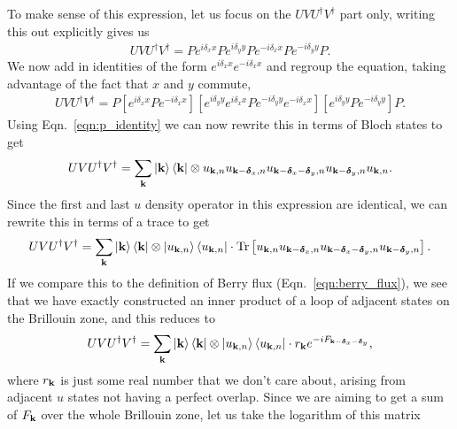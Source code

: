 To make sense of this expression, let us focus on the $  U V U^\dag  V^\dag$ part only, writing this out explicitly gives us
\begin{align}
	  U V U^\dag  V^\dag =  P e^{i \delta_x  x}  P e^{i \delta_y  y}  P e^{- i \delta_x  x}  P e^{-i \delta_y  y}  P.
\end{align}
We now add in identities of the form $e^{i \delta_x  x} e^{-i \delta_x  x} $ and regroup the equation, taking advantage of the fact that $x$ and $y$ commute,
\begin{align}
	U V U^\dag  V^\dag =   P
	\left [ 
		e^{i \delta_x  x}  P e^{-i \delta_x  x} 
	\right ]
	\left [ 
		e^{i \delta_y  y} e^{i \delta_x  x}  P  e^{-i \delta_y  y} e^{- i \delta_x  x } 
	\right ]
	\left [ 
		e^{i \delta_y  y}  P e^{-i \delta_y  y } 
	\right ]
	P.
\end{align}
Using Eqn.~\ref{eqn:p_identity} we can now rewrite this in terms of Bloch states to get
\begin{align}
	 U V U^\dag  V^\dag = \sum_{\textbf k} \ket{\textbf k } \bra{\textbf k } \otimes   u_{\textbf k, n}   u_{\textbf k -\boldsymbol{\delta}_x , n}   u_{\textbf k-\boldsymbol{\delta}_x-\boldsymbol{\delta}_y, n}   u_{\textbf k-\boldsymbol{\delta}_y, n}   u_{\textbf k, n}.
\end{align}
Since the first and last $ u$ density operator in this expression are identical, we can rewrite this in terms of a trace to get
\begin{align}
	 U V U^\dag  V^\dag = \sum_{\textbf k} \ket{\textbf k } \bra{\textbf k } \otimes  \ket {u_{\textbf k, n}} \bra{u_{\textbf k, n}} \cdot  \textup{Tr} \left [  u_{\textbf k, n}  u_{\textbf k -\boldsymbol{\delta}_x , n}   u_{\textbf k-\boldsymbol{\delta}_x-\boldsymbol{\delta}_y, n}   u_{\textbf k-\boldsymbol{\delta}_y, n} \right ].
\end{align}
If we compare this to the definition of Berry flux (Eqn.~\ref{eqn:berry_flux}), we see that we have exactly constructed an inner product of a loop of adjacent states on the Brillouin zone, and this reduces to
\begin{align}
	 U V U^\dag  V^\dag = \sum_{\textbf k} \ket{\textbf k } \bra{\textbf k } \otimes  \ket {u_{\textbf k, n}} \bra{u_{\textbf k, n}} \cdot r_{\textbf k} e^{-i F_{\textbf k-\boldsymbol{\delta}_x-\boldsymbol{\delta}_y}},
\end{align}
where $r_{\textbf k}$ is just some real number that we don't care about, arising from adjacent $u$ states not having a perfect overlap. Since we are aiming to get a sum of $F_{\textbf k}$ over the whole Brillouin zone, let us take the logarithm of this matrix
